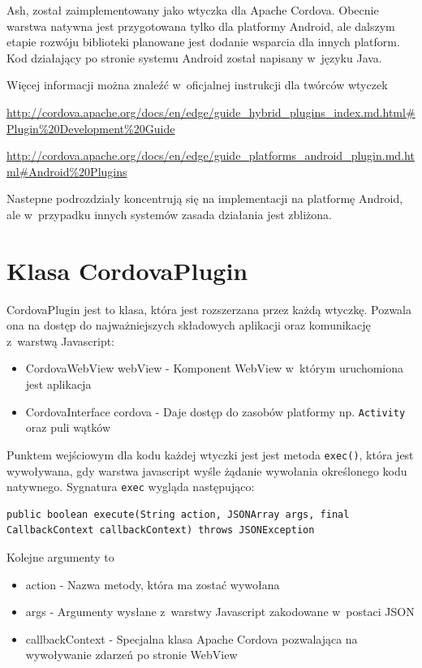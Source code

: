 \documentclass[brudnopis]{xmgr}
\begin{document}
Ash, został zaimplementowany jako wtyczka dla Apache Cordova. Obecnie warstwa natywna jest przygotowana tylko dla platformy Android, ale dalszym etapie rozwóju biblioteki planowane jest dodanie wsparcia dla innych platform. Kod działający po stronie systemu Android został napisany w~języku Java.

Więcej informacji można znaleźć w~oficjalnej instrukcji dla twórców wtyczek

\url{http://cordova.apache.org/docs/en/edge/guide\_hybrid\_plugins\_index.md.html\#Plugin\%20Development\%20Guide}  

\url{http://cordova.apache.org/docs/en/edge/guide\_platforms\_android\_plugin.md.html\#Android\%20Plugins}   

Nastepne podrozdziały koncentrują się na implementacji na platformę Android, ale w~przypadku innych systemów zasada działania jest zbliżona.

\section{Klasa CordovaPlugin}

CordovaPlugin jest to klasa, która jest rozszerzana przez każdą wtyczkę. Pozwala ona na dostęp do najważniejszych składowych aplikacji oraz komunikację z~warstwą Javascript: 

\begin{itemize}
  \item CordovaWebView webView - Komponent WebView w~którym uruchomiona jest aplikacja
  \item CordovaInterface cordova - Daje dostęp do zasobów platformy np. \texttt{Activity} oraz puli wątków
\end{itemize}

Punktem wejściowym dla kodu każdej wtyczki jest jest metoda \texttt{exec()}, która jest wywoływana, gdy warstwa javascript wyśle żądanie wywołania określonego kodu natywnego. Sygnatura \texttt{exec} wygląda następująco:

\begin{lstlisting}
public boolean execute(String action, JSONArray args, final CallbackContext callbackContext) throws JSONException
\end{lstlisting}

Kolejne argumenty to
\begin{itemize}
  \item action - Nazwa metody, która ma zostać wywołana
  \item args - Argumenty wysłane z~warstwy Javascript zakodowane w~postaci JSON
  \item callbackContext - Specjalna klasa Apache Cordova pozwalająca na wywoływanie zdarzeń po stronie WebView 
\end{itemize}
\end{document}
